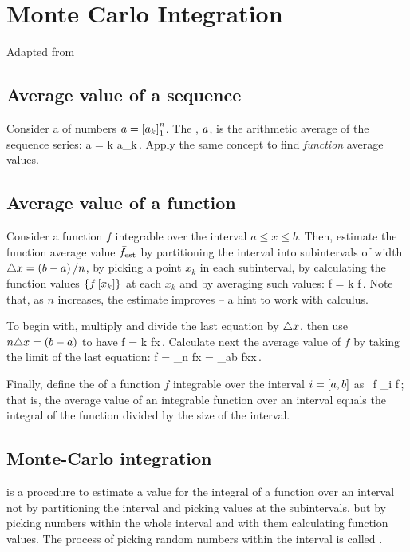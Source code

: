 \chapter*{Monte Carlo Integration}
%
Adapted from \citep{fang:2014, amth142}


\section*{Average value of a sequence}
%
Consider a  of numbers $a = \left[{a}_{k}\right]_{1}^{n}$. The , $\bar{a}$, is the arithmetic average of the sequence series:
%
\beq
  \mean a = \ssum k a_k\,.
\eeq
%
Apply the same concept to find \emph{function} average values.


\section*{Average value of a function}
%
Consider a function $f$ integrable over the interval $a\leq x\leq b$. Then, estimate the function average value $\bar{f}_\text{est}$ by partitioning the interval into subintervals of width $\triangle x = \left(b - a\right)/n$, by picking a point $x_k$ in each subinterval, by calculating the function values $\left\lbrace{f\left[{x_k}\right]}\right\rbrace$ at each $x_k$ and by averaging such values:
%
\beq
  \mean f = \ssum k f\,.
\eeq
%
Note that, as $n$ increases, the estimate improves -- a hint to work with calculus.

To begin with, multiply and divide the last equation by $\triangle x$, then use $n\triangle x = \left(b - a\right)$ to have
%
\beq
  \mean f = \ssum k f\Dx x\,.
\eeq
%
Calculate next the average value of $f$ by taking the limit of the last equation:
%
\beq
  \mean f = \lim_{n\to\infty} f\Dx x
          = \int_{\ccint ab} f\vat x\dx x\,.
\eeq

Finally, define the  of a function $f$ integrable over the interval $i = \left[{a},{b}\right]$ as~
%
\beq
  \mean f  {}\int_i f\,;
\eeq
%
that is, the average value of an integrable function over an interval equals the integral of the function divided by the size of the interval.


\section*{Monte-Carlo integration}
%
 is a procedure to estimate a value for the integral of a function over an interval not by partitioning the interval and picking values at the subintervals, but by  picking numbers within the whole interval and with them calculating function values. The process of picking random numbers within the interval is called .


